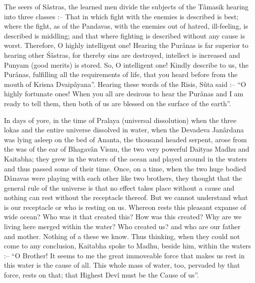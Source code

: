 The seers of S\^astras, the learned men divide the subjects of the T\^amasik hearing into three classes :-- That in which fight with the enemies is described is best; where the fight, as of the Pandavas, with the enemies out of hatred, ill-feeling, is described is middling; and that where fighting is described without any cause is worst. Therefore, O highly intelligent one! Hearing the Pur\^anas is far superior to hearing other \'S\^astras, for thereby sins are destroyed, intellect is increased and Punyam (good merits) is stored. So, O intelligent one! Kindly describe to us, the Pur\^anas, fulfilling all the requirements of life, that you heard before from the mouth of Krisna Dvaip\^ayana''. Hearing these words of the Risis, S\^uta said :-- ``O highly fortunate ones! When you all are desirous to hear the Pur\^anas and I am ready to tell them, then both of us are blessed on the surface of the earth''.

In days of yore, in the time of Pralaya (universal dissolution) when the three lokas and the entire universe dissolved in water, when the Devadeva Jan\^ardana was lying asleep on the bed of Ananta, the thousand headed serpent, arose from the was of the ear of Bhagav\^an Visnu, the two very powerful Daityas Madhu and Kaitabha; they grew in the waters of the ocean and played around in the waters and thus passed some of their time. Once, on a time, when the two huge bodied D\^anavas were playing with each other like two brothers, they thought that the general rule of the universe is that no effect takes place without a cause and nothing can rest without the receptacle thereof. But we cannot understand what is our receptacle or who is resting on us. Whereon rests this pleasant expanse of wide ocean? Who was it that created this? How was this created? Why are we living here merged within the water? Who created us? and who are our father and mother. Nothing of a these we know. Thus thinking, when they could not come to any conclusion, Kaitabha spoke to Madhu, beside him, within the waters :-- ``O Brother! It seems to me the great immoveable force that makes us rest in this water is the cause of all. This whole mass of water, too, pervaded by that force, rests on that; that Highest Dev\^i must be the Cause of us''.

